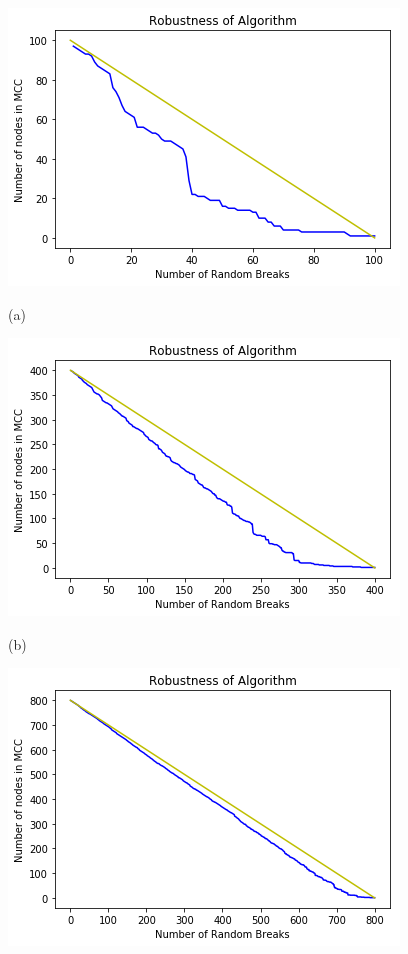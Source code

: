 \documentclass{article}
\begin{document}
	
	\begin{figure}[!htb]
		\includegraphics[width=\linewidth]{Results/100-1(G).png}
		\begin{center}
			(a)
		\end{center}
		\endminipage\hfill
		\includegraphics[width=\linewidth]{Results/400-1(G).png}
		\begin{center}
			(b)
		\end{center}
		\endminipage\hfill
		\includegraphics[width=\linewidth]{Results/800-1(G).png}

\end{figure}
\end{document}

